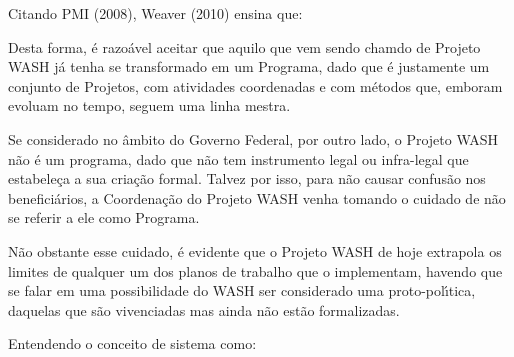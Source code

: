 \documentclass[
12pt,		%
openright,	%
twoside,  %
a4paper,			%
chapter=TITLE,		%
english,			%
french,				%
spanish,			%
brazil				%
]{USPSC-classe/USPSC_RedarTex}
\begin{document}
Citando  PMI (2008), Weaver (2010) ensina que:









\noindent\begin{center}\mbox{\centering{}}\end{center}


Desta forma, \'e razo\'avel aceitar que aquilo que vem sendo chamdo de Projeto WASH j\'a tenha se transformado em um Programa, dado que \'e justamente um conjunto de Projetos, com atividades coordenadas e com m\'etodos que, emboram evoluam no tempo, seguem uma linha mestra.








Se considerado no \^ambito do Governo Federal, por outro lado, o Projeto WASH n\~ao \'e um programa, dado que n\~ao tem instrumento legal ou infra-legal que estabele\c{c}a a sua cria\c{c}\~ao formal. Talvez por isso, para n\~ao causar confus\~ao nos benefici\'arios, a Coordena\c{c}\~ao do Projeto WASH venha tomando o cuidado de n\~ao se referir a ele como Programa.








N\~ao obstante esse cuidado, \'e evidente que o Projeto WASH de hoje extrapola os limites de qualquer um dos planos de trabalho que o implementam, havendo que se falar em uma possibilidade do WASH ser considerado uma proto-pol\'{\i}tica, daquelas que s\~ao vivenciadas mas ainda n\~ao est\~ao formalizadas.








Entendendo o conceito de sistema como:









\noindent\begin{center}\mbox{\centering{}}\end{center}
\end{document}
